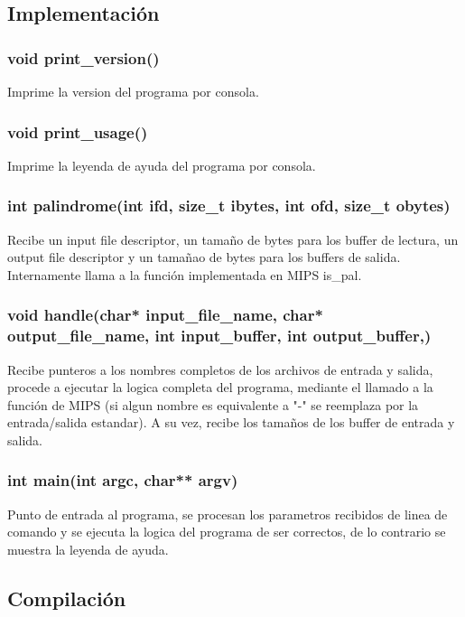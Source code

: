 \documentclass[10pt,a4paper]{article}
\begin{document}
\subsection{Implementación}

\subsubsection{void print\_version()}

Imprime la version del programa por consola.

\subsubsection{void print\_usage()}

Imprime la leyenda de ayuda del programa por consola.

\subsubsection{int palindrome(int ifd, size\_t ibytes, int ofd, size\_t obytes)}

Recibe un input file descriptor, un tamaño de bytes para los buffer de lectura, un output file descriptor y un tamañao de bytes para los buffers de salida. Internamente llama a la función implementada en MIPS is_pal.

\subsubsection{void handle(char* input\_file\_name, char* output\_file\_name, int input\_buffer, int output\_buffer,)}

Recibe punteros a los nombres completos de los archivos de entrada y salida, procede a ejecutar la logica completa del programa, mediante el llamado a la función de MIPS (si algun nombre es equivalente a "-" se reemplaza por la entrada/salida estandar). A su vez, recibe los tamaños de los buffer de entrada y salida.

\subsubsection{int main(int argc, char** argv)}

Punto de entrada al programa, se procesan los parametros recibidos de linea de comando y se ejecuta la logica del programa de ser correctos, de lo contrario se muestra la leyenda de ayuda.

\subsection{Compilación}
\end{document}
